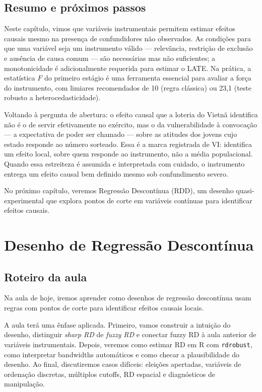 \documentclass[
]{article}
\begin{document}
\subsection{Resumo e próximos passos}\label{resumo-e-pruxf3ximos-passos-4}

Neste capítulo, vimos que variáveis instrumentais permitem estimar efeitos causais mesmo na presença de confundidores não observados. As condições para que uma variável seja um instrumento válido --- relevância, restrição de exclusão e ausência de causa comum --- são necessárias mas não suficientes; a monotonicidade é adicionalmente requerida para estimar o LATE. Na prática, a estatística \(F\) do primeiro estágio é uma ferramenta essencial para avaliar a força do instrumento, com limiares recomendados de 10 (regra clássica) ou 23,1 (teste robusto a heterocedasticidade).

Voltando à pergunta de abertura: o efeito causal que a loteria do Vietnã identifica não é o de servir efetivamente no exército, mas o da vulnerabilidade à convocação --- a expectativa de poder ser chamado --- sobre as atitudes dos jovens cujo estado responde ao número sorteado. Essa é a marca registrada de VI: identifica um efeito local, sobre quem responde ao instrumento, não a média populacional. Quando essa estreiteza é assumida e interpretada com cuidado, o instrumento entrega um efeito causal bem definido mesmo sob confundimento severo.

No próximo capítulo, veremos Regressão Descontínua (RDD), um desenho quasi-experimental que explora pontos de corte em variáveis contínuas para identificar efeitos causais.

\section{Desenho de Regressão Descontínua}\label{desenho-de-regressuxe3o-descontuxednua}

\subsection{Roteiro da aula}\label{roteiro-da-aula}

Na aula de hoje, iremos aprender como desenhos de regressão descontínua usam regras com pontos de corte para identificar efeitos causais locais.

A aula terá uma ênfase aplicada. Primeiro, vamos construir a intuição do desenho, distinguir \emph{sharp RD} de \emph{fuzzy RD} e conectar fuzzy RD à aula anterior de variáveis instrumentais. Depois, veremos como estimar RD em R com \texttt{rdrobust}, como interpretar bandwidths automáticos e como checar a plausibilidade do desenho. Ao final, discutiremos casos difíceis: eleições apertadas, variáveis de ordenação discretas, múltiplos cutoffs, RD espacial e diagnósticos de manipulação.
\end{document}
